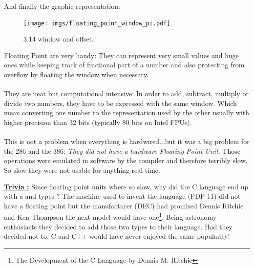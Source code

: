 \documentclass[book.tex]{subfiles}
\begin{document}
\bigskip

And finally the graphic representation:\\

\begin{figure}[H]
\centering
\texttt{[image: imgs/floating\_point\_window\_pi.pdf]}

\caption{3.14 window and offset.}
\label{fig:fp_internals}
\end{figure}
  \bigskip

Floating Point are very handy: They can represent very small values and huge ones while keeping track of fractional part of a number and also protecting from overflow by floating the window when necessary.\\
\\
They are neat but computational intensive: In order to add, subtract, multiply or divide two numbers, they have to be expressed with the same window. Which mean converting one number to the representation used by the other usually with higher precision than 32 bits (typically 80 bits on Intel FPUs).\\
\\
This is not a problem when everything is hardwired...but it was a big problem for the 286 and the 386: \emph{They did not have a hardware Floating Point Unit}. Those operations were emulated in software by the compiler and therefore terribly slow. So slow they were not usable for anything real-time. 

  \bigskip

 \textbf{\underline{Trivia :}} Since floating point units where so slow, why did the C language end up with a  and  types ? The machine used to invent the language (PDP-11) did not have a floating point but the manufacturer (DEC) had promised Dennis Ritchie and Ken Thompson the next model would have one\footnote{The Development of the C Language by Dennis M. Ritchie}. Being astronomy enthusiasts they decided to add those two types to their language. Had they decided not to, C and C++ would have never enjoyed the same popularity!
\end{document}
